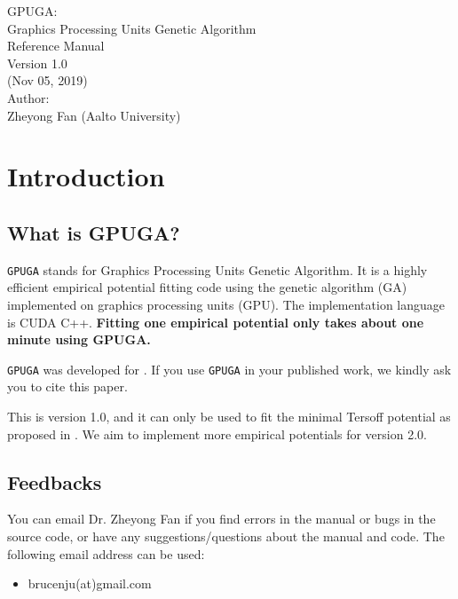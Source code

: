 \documentclass[12pt,a4paper]{report}
\begin{document}
\begin{center}
  \huge
  {
   \vspace*{1.0cm}
   GPUGA: \\
   Graphics Processing Units Genetic Algorithm \\
   \vspace*{1.0cm}
   Reference Manual\\
   \vspace*{1.0cm}
   Version 1.0 \\
   \vspace*{1.0cm}
   (Nov 05, 2019)\\
  \vspace*{2.0cm}
  }
  \large
  {
  Author: \\
  Zheyong Fan (Aalto University)\\
  }
  \vspace*{1.0cm}
\end{center}

\tableofcontents

\chapter{Introduction\label{chapter:introduction}}

\section{What is GPUGA?}

\verb"GPUGA" stands for Graphics Processing Units Genetic Algorithm. It is a highly efficient empirical potential fitting code using the genetic algorithm (GA) implemented on graphics processing units (GPU). The implementation language is CUDA C++. \textbf{Fitting one empirical potential only takes about one minute using GPUGA. }

\verb"GPUGA" was developed for \cite{fan2019arxiv}. If you use \verb"GPUGA" in your published work, we kindly ask you to cite this paper.

This is version 1.0, and it can only be used to fit the minimal Tersoff potential as proposed in \cite{fan2019arxiv}. We aim to implement more empirical potentials for version 2.0.

\section{Feedbacks}

You can email Dr. Zheyong Fan if you find errors in the manual or bugs in the source code, or have any suggestions/questions about the manual and code. The following email address can be used:
\begin{itemize}
\item brucenju(at)gmail.com
\end{itemize}
\end{document}
